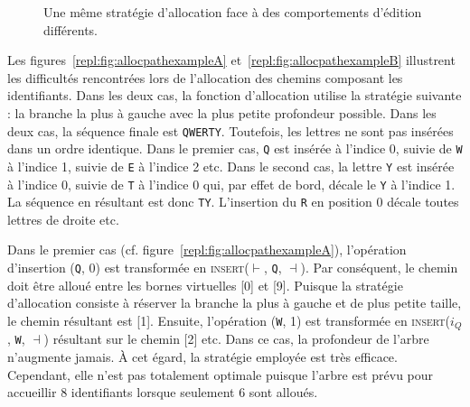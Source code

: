 \begin{figure}
  \begin{center}
  \hspace{30pt}
  \end{center}
  \caption[Une stratégie d'allocation contre les comportements d'édition] {Une
    même stratégie d'allocation face à des comportements d'édition différents.}
\end{figure}

Les figures~\ref{repl:fig:allocpathexampleA} et~\ref{repl:fig:allocpathexampleB}
illustrent les difficultés rencontrées lors de l'allocation des chemins
composant les identifiants. Dans les deux cas, la fonction d'allocation utilise
la stratégie suivante : la branche la plus à gauche avec la plus petite
profondeur possible. Dans les deux cas, la séquence finale est
\texttt{QWERTY}. Toutefois, les lettres ne sont pas insérées dans un ordre
identique. Dans le premier cas, \texttt{Q} est insérée à l'indice 0, suivie de
\texttt{W} à l'indice 1, suivie de \texttt{E} à l'indice 2 etc.  Dans le second
cas, la lettre \texttt{Y} est insérée à l'indice 0, suivie de \texttt{T} à
l'indice 0 qui, par effet de bord, décale le \texttt{Y} à l'indice 1. La
séquence en résultant est donc \texttt{TY}. L'insertion du \texttt{R} en
position 0 décale toutes lettres de droite etc.

Dans le premier cas (cf. figure~\ref{repl:fig:allocpathexampleA}), l'opération
d'insertion (\texttt{Q}, 0) est transformée en \textsc{insert}($\vdash$,
\texttt{Q}, $\dashv$). Par conséquent, le chemin doit être alloué entre les
bornes virtuelles [0] et [9]. Puisque la stratégie d'allocation consiste à
réserver la branche la plus à gauche et de plus petite taille, le chemin
résultant est [1]. Ensuite, l'opération (\texttt{W}, 1) est transformée en
\textsc{insert}($i_Q$, \texttt{W}, $\dashv$) résultant sur le chemin [2] etc.
Dans ce cas, la profondeur de l'arbre n'augmente jamais. À cet égard, la
stratégie employée est très efficace. Cependant, elle n'est pas totalement
optimale puisque l'arbre est prévu pour accueillir 8 identifiants lorsque
seulement 6 sont alloués.

